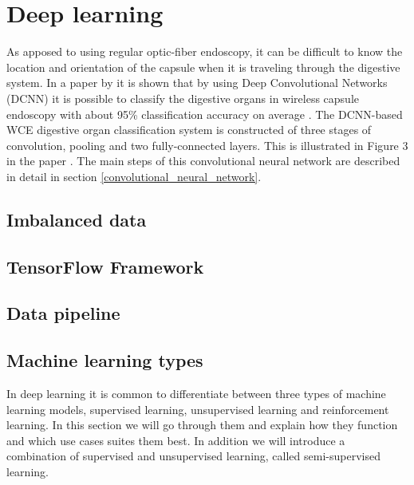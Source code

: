 \documentclass[thesis.tex]{subfiles}
\begin{document}
\section{Deep learning} \label{sec:deep_learning}
As apposed to using regular optic-fiber endoscopy, it can be difficult to know the location and orientation of the capsule when it is traveling through the digestive system. In a paper by \citeauthor*{ClassifyingDigestive15} it is shown that by using Deep Convolutional Networks (DCNN) it is possible to classify the digestive organs in wireless capsule endoscopy with about 95\% classification accuracy on average \cite{ClassifyingDigestive15}.
The DCNN-based WCE digestive organ classification system is constructed of three stages of convolution, pooling and two fully-connected layers. This is illustrated in Figure 3 in the paper \cite{ClassifyingDigestive15}. The main steps of this convolutional neural network are described in detail in section \ref{convolutional_neural_network}.

\subsection{Imbalanced data}

\subsection{TensorFlow Framework} %
\subsection{Data pipeline} %


\subsection{Machine learning types} \label{sec:machine_learning_types}
In deep learning it is common to differentiate between three types of machine learning models, supervised learning, unsupervised learning and reinforcement learning. In this section we will go through them and explain how they function and which use cases suites them best. In addition we will introduce a combination of supervised and unsupervised learning, called semi-supervised learning.
\end{document}
